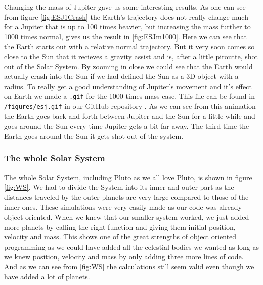 \documentclass{article}
\begin{document}
Changing the mass of Jupiter gave us some interesting results. As one can see from figure \ref{fig:ESJ1Crash} the Earth's trajectory does not really change much for a Jupiter that is up to 100 times heavier, but increasing the mass further to 1000 times normal, gives us the result in \ref{fig:ESJm1000}. Here we can see that the Earth starts out with a relative normal trajectory. But it very soon comes so close to the Sun that it recieves a gravity assist and is, after a little piroutte, shot out of the Solar System. By zooming in close we could see that the Earth would actually crash into the Sun if we had defined the Sun as a 3D object with a radius. To really get a good understanding of Jupiter's movement and it's effect on Earth we made a \texttt{.gif} for the 1000 times mass case. This file can be found in \texttt{/figures/esj.gif} in our GitHub repository \cite{Github}. As we can see from  this animation the Earth goes back and forth between Jupiter and the Sun for a little while and goes around the Sun every time Jupiter gets a bit far away. The third time the Earth goes around the Sun it gets shot out of the system.

\subsubsection{The whole Solar System}
The whole Solar System, including Pluto as we all love Pluto, is shown in figure \ref{fig:WS}. We had to divide the System into its inner and outer part as the distances traveled by the outer planets are very large compared to those of the inner ones. These simulations were very easily made as our code was already object oriented. When we knew that our smaller system worked, we just added more planets by calling the right function and giving them initial position, velocity and mass. This shows one of the great strengths of object oriented programming as we could have added all the celestial bodies we wanted as long as we knew position, velocity and mass by only adding three more lines of code. And as we can see from \ref{fig:WS} the calculations still seem valid even though we have added a lot of planets.
\end{document}

